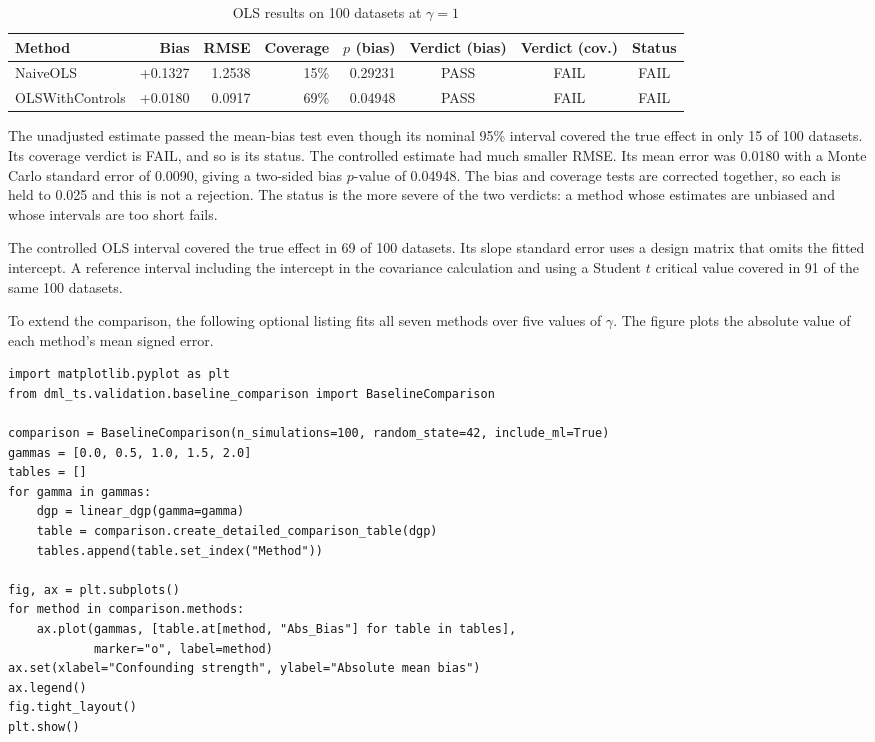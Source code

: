 \begin{table}[htbp]
\centering
\caption{OLS results on 100 datasets at $\gamma=1$}
\label{tab:exp31_results}
\setlength{\tabcolsep}{2.5pt}
\begin{tabular}{lrrrrccc}
\hline
Method & Bias & RMSE & Coverage & $p$ (bias) & Verdict (bias) & Verdict (cov.) & Status \\
\hline
NaiveOLS & +0.1327 & 1.2538 & 15\% & 0.29231 & PASS & FAIL & FAIL \\
OLSWithControls & +0.0180 & 0.0917 & 69\% & 0.04948 & PASS & FAIL & FAIL \\
\hline
\end{tabular}
\end{table}

The unadjusted estimate passed the mean-bias test even though its nominal 95\% interval covered the true effect in only 15 of 100 datasets. Its coverage verdict is FAIL, and so is its status. The controlled estimate had much smaller RMSE. Its mean error was 0.0180 with a Monte Carlo standard error of 0.0090, giving a two-sided bias $p$-value of 0.04948. The bias and coverage tests are corrected together, so each is held to 0.025 and this is not a rejection. The status is the more severe of the two verdicts: a method whose estimates are unbiased and whose intervals are too short fails.

The controlled OLS interval covered the true effect in 69 of 100 datasets. Its slope standard error uses a design matrix that omits the fitted intercept. A reference interval including the intercept in the covariance calculation and using a Student $t$ critical value covered in 91 of the same 100 datasets.

To extend the comparison, the following optional listing fits all seven methods over five values of $\gamma$. The figure plots the absolute value of each method's mean signed error.

\begin{verbatim}
import matplotlib.pyplot as plt
from dml_ts.validation.baseline_comparison import BaselineComparison

comparison = BaselineComparison(n_simulations=100, random_state=42, include_ml=True)
gammas = [0.0, 0.5, 1.0, 1.5, 2.0]
tables = []
for gamma in gammas:
    dgp = linear_dgp(gamma=gamma)
    table = comparison.create_detailed_comparison_table(dgp)
    tables.append(table.set_index("Method"))

fig, ax = plt.subplots()
for method in comparison.methods:
    ax.plot(gammas, [table.at[method, "Abs_Bias"] for table in tables],
            marker="o", label=method)
ax.set(xlabel="Confounding strength", ylabel="Absolute mean bias")
ax.legend()
fig.tight_layout()
plt.show()
\end{verbatim}

